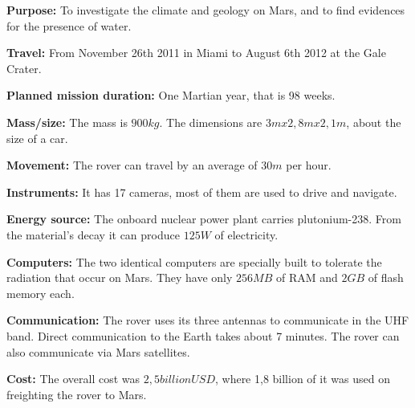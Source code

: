 \begin{tcolorbox}[colback=red!5,colframe=DarkRed!40!black,title=Curiosity: 10 facts about the rover]

\textbf{Purpose:} To investigate the climate and geology on Mars, and to find evidences for the presence of water.

\textbf{Travel:} From November 26th 2011 in Miami to August 6th 2012 at the Gale Crater.

\textbf{Planned mission duration:} One Martian year, that is 98 weeks.

\textbf{Mass/size:} The mass is $900 kg$. The dimensions are $3 m x 2,8 m x 2,1 m$, about the size of a car.

\textbf{Movement:} The rover can travel by an average of $30 m$ per hour.

\textbf{Instruments:} It has 17 cameras, most of them are used to drive and navigate.

\textbf{Energy source:} The onboard nuclear power plant carries plutonium-238. From the material's decay it can produce $125 W$ of electricity.

\textbf{Computers:} The two identical computers are specially built to tolerate the radiation that occur on Mars. They have only $256 MB$ of RAM and $2 GB$ of flash memory each.

\textbf{Communication:} The rover uses its three antennas to communicate in the UHF band. Direct communication to the Earth takes about 7 minutes. The rover can also communicate via Mars satellites.

\textbf{Cost:} The overall cost was $2,5 billion USD$, where 1,8 billion of it was used on freighting the rover to Mars.

\end{tcolorbox}